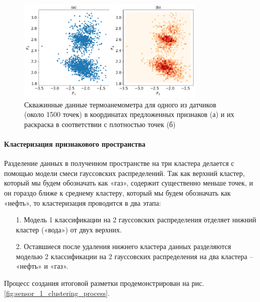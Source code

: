 \begin{figure}[H]
\centering
\includegraphics[width=0.8\textwidth]{TA/sensor_1_raw_data.png}
\caption{Скважинные данные термоанемометра для одного из датчиков (около 1500 точек) в координатах предложенных признаков (а) и их раскраска в соответствии с плотностью точек (б)}
\label{fig:sensor_1_raw_data}
\end{figure}

\paragraph{Кластеризация признакового пространства}
Разделение данных в полученном пространстве на три кластера делается с помощью модели смеси гауссовских распределений. Так как верхний кластер, который мы будем обозначать как «газ», содержит существенно меньше точек, и он гораздо ближе к среднему кластеру, который мы будем обозначать как «нефть», то кластеризация проводится в два этапа:
\begin{itemize}
    \item[1.] Модель 1 классификации на 2 гауссовских распределения отделяет нижний кластер («вода») от двух верхних.
    \item[2.] Оставшиеся после удаления нижнего кластера данных разделяются моделью 2 классификации на 2 гауссовских распределения на два кластера – «нефть» и «газ».
\end{itemize}

Процесс создания итоговой разметки продемонстрирован на рис.\ref{fig:sensor_1_clustering_process}. 

